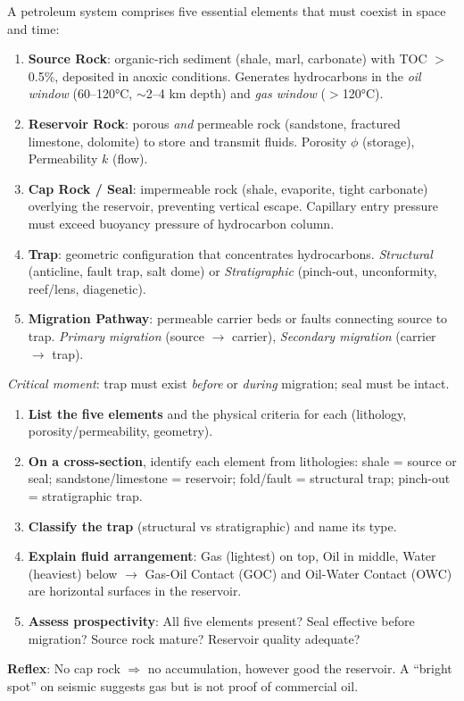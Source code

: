 \documentclass[11pt]{article}
\newcommand{\cle}[1]{{\popxbold\color{popdark}#1}}
\begin{document}
\begin{definition}
A \cle{petroleum system} comprises five essential elements that must coexist in space and time:
\begin{enumerate}
\item \textbf{Source Rock}: organic-rich sediment (shale, marl, carbonate) with TOC $>$0.5\%, deposited in anoxic conditions. Generates hydrocarbons in the \emph{oil window} (60--120°C, $\sim$2--4 km depth) and \emph{gas window} ($>$120°C).
\item \textbf{Reservoir Rock}: porous \emph{and} permeable rock (sandstone, fractured limestone, dolomite) to store and transmit fluids. Porosity $\phi$ (storage), Permeability $k$ (flow).
\item \textbf{Cap Rock / Seal}: impermeable rock (shale, evaporite, tight carbonate) overlying the reservoir, preventing vertical escape. Capillary entry pressure must exceed buoyancy pressure of hydrocarbon column.
\item \textbf{Trap}: geometric configuration that concentrates hydrocarbons. \emph{Structural} (anticline, fault trap, salt dome) or \emph{Stratigraphic} (pinch-out, unconformity, reef/lens, diagenetic).
\item \textbf{Migration Pathway}: permeable carrier beds or faults connecting source to trap. \emph{Primary migration} (source $\rightarrow$ carrier), \emph{Secondary migration} (carrier $\rightarrow$ trap).
\end{enumerate}
\emph{Critical moment}: trap must exist \emph{before} or \emph{during} migration; seal must be intact.
\end{definition}

\begin{methode}
\begin{enumerate}
\item \textbf{List the five elements} and the physical criteria for each (lithology, porosity/permeability, geometry).
\item \textbf{On a cross-section}, identify each element from lithologies: shale = source or seal; sandstone/limestone = reservoir; fold/fault = structural trap; pinch-out = stratigraphic trap.
\item \textbf{Classify the trap} (structural vs stratigraphic) and name its type.
\item \textbf{Explain fluid arrangement}: Gas (lightest) on top, Oil in middle, Water (heaviest) below $\rightarrow$ \cle{Gas-Oil Contact (GOC)} and \cle{Oil-Water Contact (OWC)} are horizontal surfaces in the reservoir.
\item \textbf{Assess prospectivity}: All five elements present? Seal effective before migration? Source rock mature? Reservoir quality adequate?
\end{enumerate}
\textbf{Reflex}: No cap rock $\Rightarrow$ no accumulation, however good the reservoir. A ``bright spot'' on seismic suggests gas but is not proof of commercial oil.
\end{methode}
\end{document}
